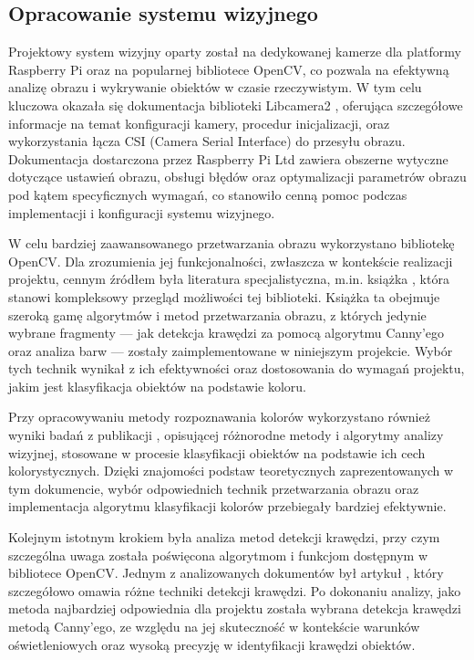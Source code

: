 \subsection{Opracowanie systemu wizyjnego}

Projektowy system wizyjny oparty został na dedykowanej kamerze dla platformy Raspberry Pi oraz na popularnej bibliotece OpenCV, co pozwala na efektywną analizę obrazu i wykrywanie obiektów w czasie rzeczywistym. W tym celu kluczowa okazała się dokumentacja biblioteki Libcamera2 \cite{bib:manualLibcamera2}, oferująca szczegółowe informacje na temat konfiguracji kamery, procedur inicjalizacji, oraz wykorzystania łącza CSI (Camera Serial Interface) do przesyłu obrazu. Dokumentacja dostarczona przez Raspberry Pi Ltd zawiera obszerne wytyczne dotyczące ustawień obrazu, obsługi błędów oraz optymalizacji parametrów obrazu pod kątem specyficznych wymagań, co stanowiło cenną pomoc podczas implementacji i konfiguracji systemu wizyjnego.

W celu bardziej zaawansowanego przetwarzania obrazu wykorzystano bibliotekę OpenCV. Dla zrozumienia jej funkcjonalności, zwłaszcza w kontekście realizacji projektu, cennym źródłem była literatura specjalistyczna, m.in. książka \cite{bib:ksiazka}, która stanowi kompleksowy przegląd możliwości tej biblioteki. Książka ta obejmuje szeroką gamę algorytmów i metod przetwarzania obrazu, z których jedynie wybrane fragmenty — jak detekcja krawędzi za pomocą algorytmu Canny’ego oraz analiza barw — zostały zaimplementowane w niniejszym projekcie. Wybór tych technik wynikał z ich efektywności oraz dostosowania do wymagań projektu, jakim jest klasyfikacja obiektów na podstawie koloru.

Przy opracowywaniu metody rozpoznawania kolorów wykorzystano również wyniki badań z publikacji \cite{bib:artykul2}, opisującej różnorodne metody i algorytmy analizy wizyjnej, stosowane w procesie klasyfikacji obiektów na podstawie ich cech kolorystycznych. Dzięki znajomości podstaw teoretycznych zaprezentowanych w tym dokumencie, wybór odpowiednich technik przetwarzania obrazu oraz implementacja algorytmu klasyfikacji kolorów przebiegały bardziej efektywnie.

Kolejnym istotnym krokiem była analiza metod detekcji krawędzi, przy czym szczególna uwaga została poświęcona algorytmom i funkcjom dostępnym w bibliotece OpenCV. Jednym z analizowanych dokumentów był artykuł \cite{bib:artykul}, który szczegółowo omawia różne techniki detekcji krawędzi. Po dokonaniu analizy, jako metoda najbardziej odpowiednia dla projektu została wybrana detekcja krawędzi metodą Canny’ego, ze względu na jej skuteczność w kontekście warunków oświetleniowych oraz wysoką precyzję w identyfikacji krawędzi obiektów.


